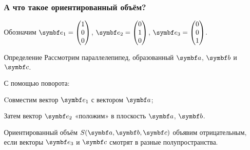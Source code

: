 \begin{frame}
    \frametitle{А что такое ориентированный объём?}

\pause 

Обозначим $\be_1 = \begin{pmatrix}
    1 \\
    0 \\
    0 \\
\end{pmatrix}$, $\be_2 = \begin{pmatrix}
    0 \\
    1 \\
    0
\end{pmatrix}$, $\be_3 = \begin{pmatrix}
    0 \\
    0 \\
    1 \\
\end{pmatrix}$.



\pause

\begin{block}{Определение}
    Рассмотрим параллелепипед, образованный $\ba$, $\bb$ и $\bc$.

    \pause

    С помощью поворота: 

    Cовместим вектор $\be_1$ с вектором $\ba$;

    Затем вектор $\be_2$ «положим» в плоскость $\ba$, $\bb$.

    \pause

    \alert{Ориентированный объём} $S(\ba, \bb, \bc)$ объявим отрицательным,
    если векторы $\be_3$ и $\bc$ смотрят в разные полупространства.
    
\end{block}



    

\end{frame}


